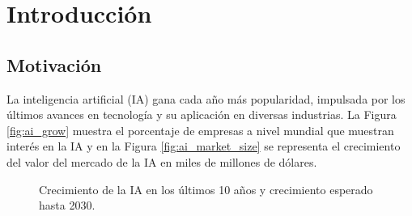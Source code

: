 \chapter{Introducción} \label{ch:intro}

\section{Motivación}

La inteligencia artificial (IA) gana cada año más popularidad, impulsada por los últimos avances en tecnología y su aplicación en diversas industrias. La Figura \ref{fig:ai_grow} muestra el porcentaje de empresas a nivel mundial que muestran interés en la IA y en la Figura \ref{fig:ai_market_size} se representa el crecimiento del valor del mercado de la IA en miles de millones de dólares.

\begin{figure}[htb]
  \begin{subcaptiongroup}
  \begin{floatrow}
  \end{floatrow}
  \end{subcaptiongroup}
  \caption{Crecimiento de la IA en los últimos 10 años y crecimiento esperado hasta 2030.}%
\end{figure}

